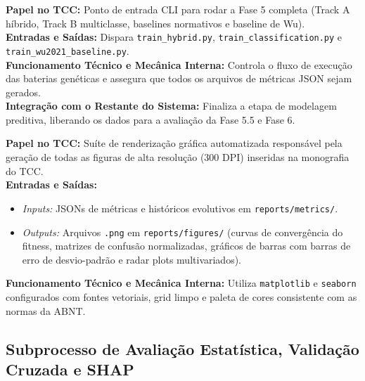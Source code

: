 \documentclass[10pt,a4paper]{article}
\begin{document}
\begin{filebox}
\textbf{Papel no TCC:} Ponto de entrada CLI para rodar a Fase 5 completa (Track A híbrido, Track B multiclasse, baselines normativos e baseline de Wu).\\
\textbf{Entradas e Saídas:} Dispara \texttt{train\_hybrid.py}, \texttt{train\_classification.py} e \texttt{train\_wu2021\_baseline.py}.\\
\textbf{Funcionamento Técnico e Mecânica Interna:} Controla o fluxo de execução das baterias genéticas e assegura que todos os arquivos de métricas JSON sejam gerados.\\
\textbf{Integração com o Restante do Sistema:} Finaliza a etapa de modelagem preditiva, liberando os dados para a avaliação da Fase 5.5 e Fase 6.
\end{filebox}

\begin{filebox}
\textbf{Papel no TCC:} Suíte de renderização gráfica automatizada responsável pela geração de todas as figuras de alta resolução (300 DPI) inseridas na monografia do TCC.\\
\textbf{Entradas e Saídas:}
\begin{itemize}[leftmargin=*,itemsep=1pt]
  \item \textit{Inputs:} JSONs de métricas e históricos evolutivos em \texttt{reports/metrics/}.
  \item \textit{Outputs:} Arquivos \texttt{.png} em \texttt{reports/figures/} (curvas de convergência do fitness, matrizes de confusão normalizadas, gráficos de barras com barras de erro de desvio-padrão e radar plots multivariados).
\end{itemize}
\textbf{Funcionamento Técnico e Mecânica Interna:} Utiliza \texttt{matplotlib} e \texttt{seaborn} configurados com fontes vetoriais, grid limpo e paleta de cores consistente com as normas da ABNT.
\end{filebox}

\subsection{Subprocesso de Avaliação Estatística, Validação Cruzada e SHAP}
\end{document}
